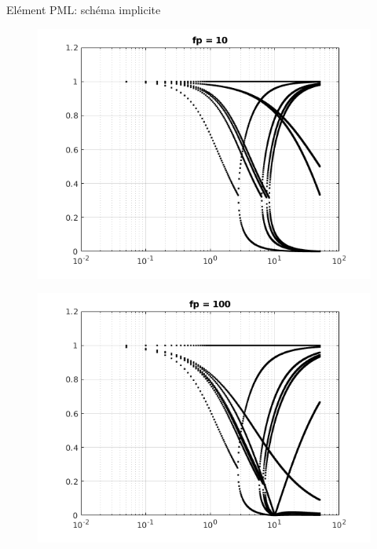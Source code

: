 \begin{frame}{Elément PML: schéma implicite}
\begin{figure}[ht]
\begin{minipage}[b]{0.5\linewidth}
  \end{minipage}%
  \begin{minipage}[b]{0.5\linewidth}
    \centering
    \includegraphics[scale=.34]{images/sr_imp_pml10.png} \\
  \end{minipage} 
  \begin{minipage}[b]{0.5\linewidth}
    \centering
    \includegraphics[scale=.34]{images/sr_imp_pml100.png} \\
  \end{minipage} 

\end{figure}
\end{frame}

